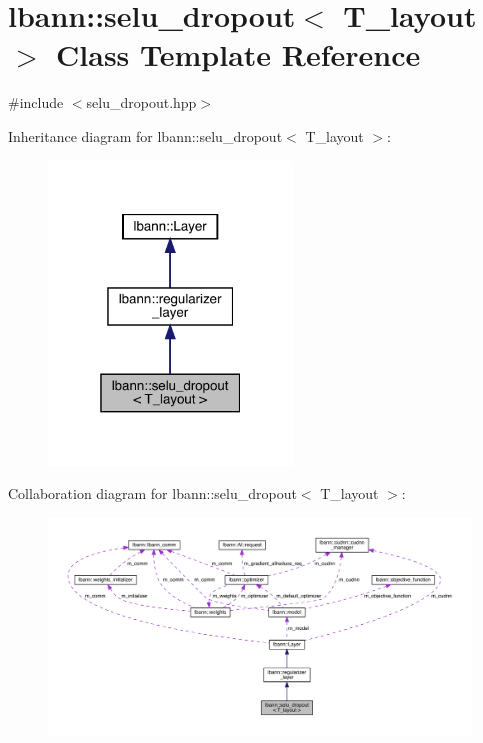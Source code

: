 \hypertarget{classlbann_1_1selu__dropout}{}\section{lbann\+:\+:selu\+\_\+dropout$<$ T\+\_\+layout $>$ Class Template Reference}
\label{classlbann_1_1selu__dropout}


{\ttfamily \#include $<$selu\+\_\+dropout.\+hpp$>$}



Inheritance diagram for lbann\+:\+:selu\+\_\+dropout$<$ T\+\_\+layout $>$\+:\nopagebreak
\begin{figure}[H]
\begin{center}
\leavevmode
\includegraphics[width=184pt]{classlbann_1_1selu__dropout__inherit__graph}
\end{center}
\end{figure}


Collaboration diagram for lbann\+:\+:selu\+\_\+dropout$<$ T\+\_\+layout $>$\+:\nopagebreak
\begin{figure}[H]
\begin{center}
\leavevmode
\includegraphics[width=350pt]{classlbann_1_1selu__dropout__coll__graph}
\end{center}
\end{figure}
